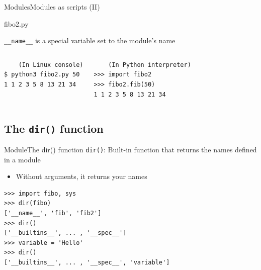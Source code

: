 \documentclass[10pt,compress]{beamer} %
\begin{document}
\begin{frame}{Modules}{Modules as scripts (II)}

    \small
	\vspace{-0.3cm}
	\begin{exampleblock}{fibo2.py}
	\vspace{-0.2cm}
	
	\vspace{-0.2cm}
	\end{exampleblock}

    \medskip
    \normalsize{\texttt{\_\_name\_\_} is a special variable set to the module's name}\\
    \medskip

	\vspace{-0.5cm}
	\begin{columns}
	\begin{exampleblock}{}
	\vspace{-0.2cm}
	\begin{verbatim}
    (In Linux console)
$ python3 fibo2.py 50
1 1 2 3 5 8 13 21 34
\end{verbatim}
	\vspace{-0.2cm}
	\end{exampleblock}

	\begin{exampleblock}{}
	\vspace{-0.2cm}
	\begin{verbatim}
    (In Python interpreter)
>>> import fibo2
>>> fibo2.fib(50)
1 1 2 3 5 8 13 21 34
\end{verbatim}
	\vspace{-0.2cm}
	\end{exampleblock}

    \end{columns}
\end{frame}


\subsection{The \texttt{dir()} function}

\begin{frame}[fragile]{Module}{The dir() function}
	\texttt{dir()}: Built-in function that returns the names defined in a module
	\begin{itemize}
		\item Without arguments, it returns your names
	\end{itemize}

    \smallskip

	\begin{exampleblock}{}
	\begin{verbatim}
>>> import fibo, sys
>>> dir(fibo)
['__name__', 'fib', 'fib2']
>>> dir()
['__builtins__', ... , '__spec__']
>>> variable = 'Hello'
>>> dir()
['__builtins__', ... , '__spec__', 'variable']
\end{verbatim}
	\vspace{-0.2cm}
	\end{exampleblock}
\end{frame}
\end{document}
